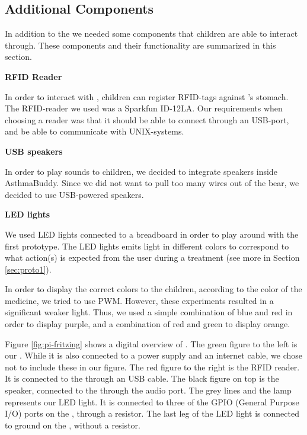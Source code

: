   
\subsection{Additional Components}
\label{sec:additionalcomponents}
In addition to the \rpi{} we needed some components that children are able to interact through. These components and their functionality are summarized in this section. 


\textbf{RFID Reader}

In order to interact with \ab{}, children can register RFID-tags against \ab{}'s stomach. The RFID-reader we used was a Sparkfun ID-12LA. Our requirements when choosing a reader was that it should be able to connect through an USB-port, and be able to communicate with UNIX-systems.
         
\textbf{USB speakers}

In order to play sounds to children, we decided to integrate speakers inside AsthmaBuddy. Since we did not want to pull too many wires out of the bear, we decided to use USB-powered speakers.    


\textbf{LED lights}

We used LED lights connected to a breadboard in order to play around with the first prototype. The LED lights emits light in different colors to correspond to what action(s) is expected from the user during a treatment (see more in Section \ref{sec:proto1}). 

In order to display the correct colors to the children, according to the color of the medicine, we tried to use PWM. However, these experiments resulted in a significant weaker light. Thus, we used a simple combination of blue and red in order to display purple, and a combination of red and green to display orange.  

 
Figure \ref{fig:pi-fritzing} shows a digital overview of \buddy{}. The green figure to the left is our \rpi{}. While it is also connected to a power supply and an internet cable, we chose not to include these in our figure. The red figure to the right is the RFID reader. It is connected to the \rpi{} through an USB cable. The black figure on top is the speaker, connected to the \rpi{} through the audio port. 
The grey lines and the lamp represents our LED light. It is connected to three of the GPIO (General Purpose I/O) ports on the \rpi{}, through a resistor. The last leg of the LED light is connected to ground on the \rpi{}, without a resistor.

